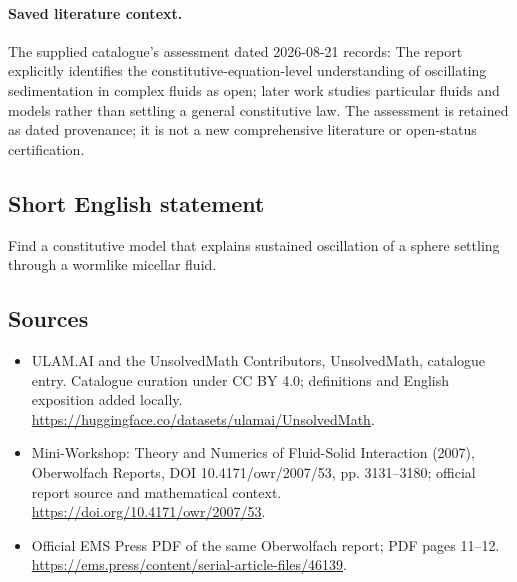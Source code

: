 \documentclass[11pt]{article}
\begin{document}
\paragraph{Saved literature context.} The supplied catalogue's assessment dated 2026-08-21 records: The report explicitly identifies the constitutive-equation-level understanding of oscillating sedimentation in complex fluids as open; later work studies particular fluids and models rather than settling a general constitutive law. The assessment is retained as dated provenance; it is not a new comprehensive literature or open-status certification.
\subsection{Short English statement}
Find a constitutive model that explains sustained oscillation of a sphere settling through a wormlike micellar fluid.
\subsection{Sources}
\begin{itemize}
\item[\hypertarget{source:statement:1}{S1}] ULAM.AI and the UnsolvedMath Contributors, UnsolvedMath, catalogue entry. Catalogue curation under CC BY 4.0; definitions and English exposition added locally.
\url{https://huggingface.co/datasets/ulamai/UnsolvedMath}.
\item[\hypertarget{source:statement:2}{S2}] Mini-Workshop: Theory and Numerics of Fluid-Solid Interaction (2007), Oberwolfach Reports, DOI 10.4171/owr/2007/53, pp. 3131--3180; official report source and mathematical context.
\url{https://doi.org/10.4171/owr/2007/53}.
\item[\hypertarget{source:statement:3}{S3}] Official EMS Press PDF of the same Oberwolfach report; PDF pages 11--12.
\url{https://ems.press/content/serial-article-files/46139}.
\end{itemize}
\label{end:statement}
\end{document}
